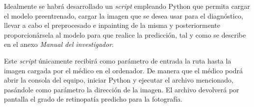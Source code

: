 Idealmente se habrá desarrollado un \textit{script} empleando Python que permita cargar el modelo preentrenado, cargar la imagen que se desea usar para el diagnóstico, llevar a cabo el preprocesado  e inpainting de la misma y posteriormente proporcionársela al modelo para que realice la predicción, tal y como se describe en el anexo \textit{Manual del investigador}.

Este \textit{script} únicamente recibirá como parámetro de entrada la ruta hasta la imagen cargada por el médico en el ordenador. De manera que el médico podrá abrir la consola del equipo, iniciar Python y ejecutar el archivo mencionado, pasándole como parámetro la dirección de la imagen. El archivo devolverá por pantalla el grado de retinopatía predicho para la fotografía.